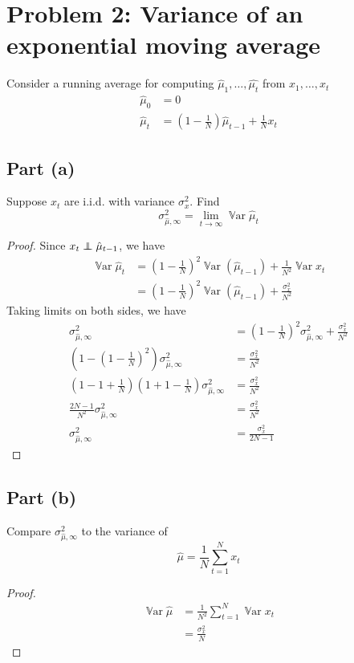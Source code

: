 \documentclass{amsart}
\newcommand\ind{\protect\mathpalette{\protect\independenT}{\perp}}
\def\independenT#1#2{\mathrel{\rlap{$#1#2$}\mkern2mu{#1#2}}}
\DeclareMathOperator{\Var}{\mathbb{V}ar}  %
\theoremstyle{definition}
\begin{document}
\section*{Problem 2: Variance of an exponential moving average}
Consider a running average for computing $\hat{\mu}_1, \ldots, \hat{\mu_t}$ from $x_1, \ldots, x_t$
\begin{align*}
    \hat{\mu}_0 &= 0\\
    \hat{\mu}_t &= \left(
    1 - \frac1{N} 
    \right) \hat{\mu}_{t - 1} + \frac1{N} x_t
\end{align*}
\subsection*{Part (a)} Suppose $x_t$ are i.i.d. with variance $\sigma_x^2$. 
Find 
\[
\sigma_{\hat{\mu}, \infty}^2 = \lim_{t\to\infty} \Var{\hat{\mu}_t}
\]
\begin{proof}
    Since $x_t \ind \hat{\mu}_{t - 1}$, we have
    \begin{align*}
        \Var{\hat{\mu}_t} &= \left(
            1 - \frac1{N}
        \right)^2\Var{ (\hat{\mu}_{t - 1})} + \frac1{N^2} \Var{x_t} \\
        &= \left(1 - \frac1{N}\right)^2 \Var{(\hat{\mu}_{t - 1})} + \frac{\sigma_x^2}{N^2}
    \end{align*}
    Taking limits on both sides, we have
    \begin{align*}
        \sigma_{\hat{\mu}, \infty}^2 &= \left(1 - \frac1{N}\right)^2 \sigma_{\hat{\mu}, \infty}^2 + \frac{\sigma_x^2}{N^2}\\ 
        \left(
            1 - \left(1 - \frac1{N}\right)^2
        \right) \sigma_{\hat{\mu}, \infty}^2 &= \frac{\sigma_x^2}{N^2} \\
        \left(
            1 - 1 + \frac1{N}
        \right)\left(
            1 + 1 - \frac1{N}
        \right) \sigma_{\hat{\mu}, \infty}^2 &= \frac{\sigma_x^2}{N^2} \\
        \frac{2N - 1}{N^2} \sigma_{\hat{\mu}, \infty}^2 &= \frac{\sigma_x^2}{N^2} \\
        \sigma_{\hat{\mu}, \infty}^2 &= \frac{\sigma_x^2}{2N - 1}
    \end{align*}
\end{proof}
\subsection*{Part (b)} Compare $\sigma_{\hat{\mu}, \infty}^2$ to the variance of 
\[
\hat{\mu} = \frac1{N} \sum_{t = 1}^N x_t
\]
\begin{proof}
    \begin{align*}
        \Var{\hat{\mu}} &= \frac1{N^2} \sum_{t = 1}^N \Var{x_t} \\
        &= \frac{\sigma_x^2}{N}
    \end{align*}
\end{proof}
\end{document}
